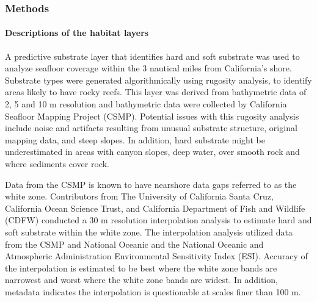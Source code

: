 \documentclass[11pt,
  english,
  a4paper,
]{article}
\begin{document}
\leavevmode\tagmcend\tagstructend\par


\hypertarget{methods}{%
\subsubsection{Methods}\label{methods}}

\leavevmode\tagmcend\tagstructend


\hypertarget{descriptions-of-the-habitat-layers}{%
\paragraph{Descriptions of the habitat layers}\label{descriptions-of-the-habitat-layers}}

\leavevmode\tagmcend\tagstructend


A predictive substrate layer that identifies hard and soft substrate was used to analyze seafloor coverage within the 3 nautical miles from California's shore. Substrate types were generated algorithmically using rugosity analysis, to identify areas likely to have rocky reefs. This layer was derived from bathymetric data of 2, 5 and 10 m resolution and bathymetric data were collected by California Seafloor Mapping Project (CSMP). Potential issues with this rugosity analysis include noise and artifacts resulting from unusual substrate structure, original mapping data, and steep slopes. In addition, hard substrate might be underestimated in areas with canyon slopes, deep water, over smooth rock and where sediments cover rock.

\leavevmode\tagmcend\tagstructend\par


Data from the CSMP is known to have nearshore data gaps referred to as the white zone. Contributors from The University of California Santa Cruz, California Ocean Science Trust, and California Department of Fish and Wildlife (CDFW) conducted a 30 m resolution interpolation analysis to estimate hard and soft substrate within the white zone. The interpolation analysis utilized data from the CSMP and National Oceanic and the National Oceanic and Atmospheric Administration Environmental Sensitivity Index (ESI). Accuracy of the interpolation is estimated to be best where the white zone bands are narrowest and worst where the white zone bands are widest. In addition, metadata indicates the interpolation is questionable at scales finer than 100 m.
\end{document}
